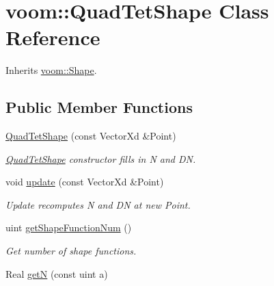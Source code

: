\hypertarget{classvoom_1_1_quad_tet_shape}{
\section{voom::QuadTetShape Class Reference}
\label{classvoom_1_1_quad_tet_shape}
}


Inherits \hyperlink{classvoom_1_1_shape}{voom::Shape}.\subsection*{Public Member Functions}
\begin{DoxyCompactItemize}
\item 
\hypertarget{classvoom_1_1_quad_tet_shape_aedeac8642bf89f458f00d84481e3d624}{
\hyperlink{classvoom_1_1_quad_tet_shape_aedeac8642bf89f458f00d84481e3d624}{QuadTetShape} (const VectorXd \&Point)}
\label{classvoom_1_1_quad_tet_shape_aedeac8642bf89f458f00d84481e3d624}

\begin{DoxyCompactList}\small\item\em \hyperlink{classvoom_1_1_quad_tet_shape}{QuadTetShape} constructor fills in N and DN. \item\end{DoxyCompactList}\item 
void \hyperlink{classvoom_1_1_quad_tet_shape_a299d2a86a8444228197fa93fae54d45e}{update} (const VectorXd \&Point)
\begin{DoxyCompactList}\small\item\em Update recomputes N and DN at new Point. \item\end{DoxyCompactList}\item 
\hypertarget{classvoom_1_1_quad_tet_shape_ad1a24455a705ef22307b923c709801d5}{
uint \hyperlink{classvoom_1_1_quad_tet_shape_ad1a24455a705ef22307b923c709801d5}{getShapeFunctionNum} ()}
\label{classvoom_1_1_quad_tet_shape_ad1a24455a705ef22307b923c709801d5}

\begin{DoxyCompactList}\small\item\em Get number of shape functions. \item\end{DoxyCompactList}\item 
\hypertarget{classvoom_1_1_quad_tet_shape_abf433f81b53e475e8943b357a663687a}{
Real \hyperlink{classvoom_1_1_quad_tet_shape_abf433f81b53e475e8943b357a663687a}{getN} (const uint a)}
\label{classvoom_1_1_quad_tet_shape_abf433f81b53e475e8943b357a663687a}


\end{DoxyCompactItemize}
